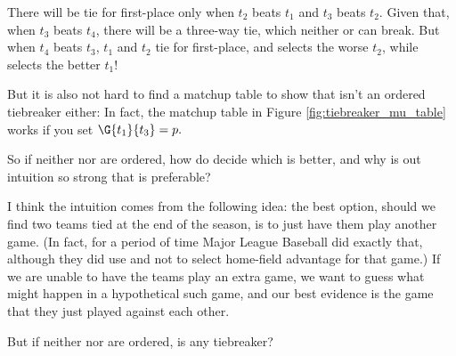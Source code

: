 {    There will be tie for first-place only when $t_2$ beats $t_1$ and $t_3$ beats $t_2.$ Given that, when $t_3$ beats $t_4$, there will be a three-way tie, which neither  or  can break. But when $t_4$ beats $t_3$, $t_1$ and $t_2$ tie for first-place, and  selects the worse $t_2$, while  selects the better $t_1$!

    But it is also not hard to find a matchup table to show that  isn't an ordered tiebreaker either: In fact, the matchup table in Figure \ref{fig:tiebreaker_mu_table} works if you set $\G{t_1}{t_3} = p.$

    So if neither  nor  are ordered, how do decide which is better, and why is out intuition so strong that  is preferable?

    I think the intuition comes from the following idea: the best option, should we find two teams tied at the end of the season, is to just have them play another game. (In fact, for a period of time Major League Baseball did exactly that, although they did use  and not  to select home-field advantage for that game.) If we are unable to have the teams play an extra game, we want to guess what might happen in a hypothetical such game, and our best evidence is the game that they just played against each other.

    But if neither  nor  are ordered, is any tiebreaker?



}